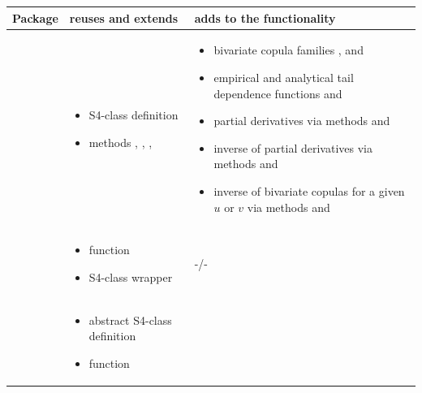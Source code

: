 \documentclass[article,nojss]{jss}
\begin{document}
\begin{table}
\small
\setlength{\itemsep}{-2pt}
\centering
\begin{tabular}{l|L{0.35\textwidth} L{0.45\textwidth}}
Package &  reuses and extends &  adds to the functionality \\ \hline
{} &
\begin{itemize}[leftmargin=*, noitemsep, nosep]\vspace{-\baselineskip}
\item S4-class definition 
\item methods , , , \vspace{-0.9\baselineskip}
\end{itemize} & 
\begin{itemize}[leftmargin=*, noitemsep, nosep]\vspace{-\baselineskip}
\item bivariate copula families ,  and 
\item empirical and analytical tail dependence functions  and 
\item partial derivatives via methods  and 
\item inverse of partial derivatives via methods  and 
\item inverse of bivariate copulas for a given $u$ or $v$ via methods  and \vspace{-0.9\baselineskip}
\end{itemize} \\
 &
\begin{itemize}[leftmargin=*, noitemsep, nosep]\vspace{-\baselineskip}
\item function 
\item S4-class wrapper \vspace{-0.9\baselineskip}
\end{itemize} & 
-/- \\
 &
\begin{itemize}[leftmargin=*, noitemsep, nosep]\vspace{-\baselineskip}
\item abstract S4-class definition 
\item function \vspace{-0.9\baselineskip}

\end{itemize}
\end{tabular}
\end{table}
\end{document}
